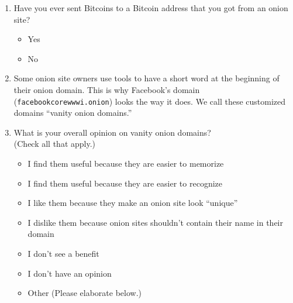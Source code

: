 \begin{enumerate}
    \item Have you ever sent Bitcoins to a Bitcoin address that you got from an
        onion site?
        \begin{itemize}[label=$\Circle$]
            \item Yes
            \item No
        \end{itemize}

    \item Some onion site owners use tools to have a short word at the
        beginning of their onion domain. This is why Facebook's domain
        (\texttt{facebookcorewwwi.onion}) looks the way it does. We call these
        customized domains ``vanity onion domains.''

    \item What is your overall opinion on vanity onion domains?\\(Check all
        that apply.)
        \begin{itemize}[label=$\Square$]
            \item I find them useful because they are easier to memorize
            \item I find them useful because they are easier to recognize
            \item I like them because they make an onion site look ``unique''
            \item I dislike them because onion sites shouldn't contain their
                name in their domain
            \item I don't see a benefit
            \item I don't have an opinion
            \item Other (Please elaborate below.)
        \end{itemize}
\end{enumerate}

